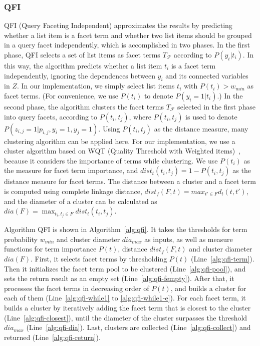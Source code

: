 \subsubsection{QFI}
QFI (Query Faceting Independent) approximates the results by predicting whether a list item is a facet term and whether two list items should be grouped in a query facet independently, which is accomplished in two phases.
In the first phase, QFI selects a set of list items as facet terms $T_\mathcal{F}$ according to $P(y_i|t_i)$.
In this way, the algorithm predicts whether a list item $t_i$ is a facet term independently, ignoring the dependences between $y_i$ and its connected variables in $Z$.
In our implementation, we simply select list items $t_i$ with  $P(t_i)> w_{min}$ as facet terms. (For convenience, we use $P(t_i)$ to denote $P(y_i=1|t_i)$.)
In the second phase, the algorithm clusters the facet terms $T_\mathcal{F}$ selected in the first phase into query facets, according to $P(t_i,t_j)$, where $P(t_i, t_j)$ is used to denote $P(z_{i,j}=1|p_{i,j},y_i=1,y_j=1)$. Using $P(t_i,t_j)$ as the distance measure, many clustering algorithm can be applied here.
For our implementation, we use a cluster algorithm based on WQT (Quality Threshold with Weighted items)~\cite{dou2011finding}, because it considers the importance of terms while clustering.
We use $P(t_i)$ as the measure for facet term importance, and $dist_t(t_i,t_j)=1-P(t_i, t_j)$ as the distance measure for facet terms. The distance between a cluster and a facet term is computed using complete linkage distance, $dist_f(F,t)=max_{t' \in F}{d_t(t, t')}$, and the diameter of a cluster can be calculated as $dia(F)=\max_{t_i,t_j\in F}{dist_t(t_i,t_j)}$. 

Algorithm QFI is shown in Algorithm~\ref{alg:qfi}. It takes the thresholds for term probability $w_{min}$ and cluster diameter $dia_{max}$ as inputs, as well as measure functions for term importance $P(t)$, distance $dist_f(F,t)$ and cluster diameter $dia(F)$. First, it selects facet terms by thresholding $P(t)$ (Line~\ref{alg:qfi-term}). Then it initializes the facet term pool to be clustered (Line~\ref{alg:qfi-pool}), and sets the return result as an empty set (Line~\ref{alg:qfi-fempty}). After that, it processes the facet terms in decreasing order of $P(t)$, and builds a cluster for each of them (Line~\ref{alg:qfi-while1} to \ref{alg:qfi-while1-e}). For each facet term, it builds a cluster by iteratively adding the facet term that is closest to the cluster (Line~\ref{alg:qfi-closest}), until the diameter of the cluster surpasses the threshold $dia_{max}$ (Line~\ref{alg:qfi-dia}). Last, clusters are collected (Line~\ref{alg:qfi-collect}) and returned (Line~\ref{alg:qfi-return}).

